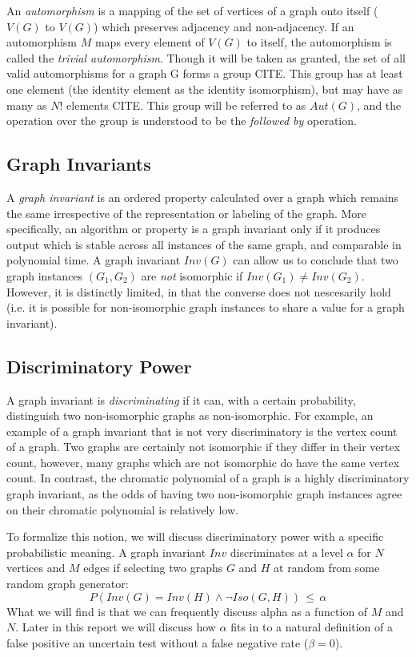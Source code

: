 \documentclass[11pt,a4paper]{report}
\begin{document}
An \emph{automorphism} is a mapping of the set of vertices of a graph onto itself ($V(G)$ to $V(G)$) which preserves adjacency and non-adjacency.
If an automorphism $M$ maps every element of $V(G)$ to itself, the automorphism is called the \emph{trivial automorphism}.
Though it will be taken as granted, the set of all valid automorphisms for a graph G forms a group CITE.
This group has at least one element (the identity element as the identity isomorphism), but may have as many as $N!$ elements CITE.
This group will be referred to as $Aut(G)$, and the operation over the group is understood to be the \emph{followed by} operation.

\subsection{Graph Invariants}
A \emph{graph invariant} is an ordered property calculated over a graph which remains the same irrespective of the representation or labeling of the graph.
More specifically, an algorithm or property is a graph invariant only if it produces output which is stable across all instances of the same graph, and comparable in polynomial time.
A graph invariant $Inv(G)$ can allow us to conclude that two graph instances $(G_1, G_2)$ are \emph{not} isomorphic if $Inv(G_1) \neq Inv(G_2)$.
However, it is distinctly limited, in that the converse does not nescesarily hold (i.e. it is possible for non-isomorphic graph instances to share a value for a graph invariant).

\subsection{Discriminatory Power}
A graph invariant is \emph{discriminating} if it can, with a certain probability, distinguish two non-isomorphic graphs as non-isomorphic.
For example, an example of a graph invariant that is not very discriminatory is the vertex count of a graph.
Two graphs are certainly not isomorphic if they differ in their vertex count, however, many graphs which are not isomorphic do have the same vertex count.
In contrast, the chromatic polynomial of a graph is a highly discriminatory graph invariant, as the odds of having two non-isomorphic graph instances agree on their chromatic polynomial is relatively low.

To formalize this notion, we will discuss discriminatory power with a specific probabilistic meaning.
A graph invariant $Inv$ discriminates at a level $\alpha$ for $N$ vertices and $M$ edges if selecting two graphs $G$ and $H$ at random from some random graph generator:
$$P(Inv(G) = Inv(H) \wedge \neg Iso(G, H)) \, \leq \, \alpha$$
What we will find is that we can frequently discuss alpha as a function of $M$ and $N$.
Later in this report we will discuss how $\alpha$ fits in to a natural definition of a false positive an uncertain test without a false negative rate ($\beta = 0$).
\end{document}

